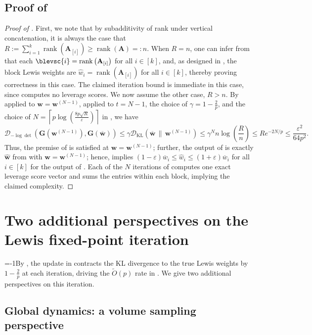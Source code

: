 \documentclass[11pt]{article}
\theoremstyle{plain}
\numberwithin{equation}{section}
\newcommand{\rank}{\operatorname{rank}}
\newcommand{\eps}{\varepsilon}
\newcommand{\bA}{\mathbf{A}}
\newcommand{\bG}{\mathbf{G}}
\newcommand{\bw}{\mathbf{w}}
\newcommand{\bwhat}{\widehat{\mathbf{w}}}
\newcommand{\bwbar}{\overline{\mathbf{w}}}
\newcommand{\bAblk}[1]{\mathbf{A}_{[#1]}}
\newcommand{\what}{\widehat{w}}
\newcommand{\wbar}{\overline{w}}
\newcommand{\omrp}{\gamma}
\newcommand{\kldiv}[2]{\mathcal{D}_{\mathrm{KL}}\left(#1 \,\|\, #2\right)}
\newcommand{\logdetdiv}[2]{\mathcal{D}_{-\log\det}\left(#1, #2\right)}
\begin{document}
\subsection{Proof of }\label{sec:main-proof}
\begin{proof}[Proof of ]
First, we note that by subadditivity of rank under vertical concatenation, it is always  the case that $R:= \sum_{i=1}^k \rank\left(\bAblk{i}\right)\geq \rank(\bA)=: n$. 
When $R = n$, one can infer from  that each $\blevsc{i}=\rank\left(\bAblk{i}\right)$ for all $i\in[k]$, and, as designed in , the block Lewis weights are  $\what_i=\rank\left(\bAblk{i}\right)$ for all $i\in[k]$, thereby proving correctness in this case. The claimed iteration bound is immediate in this case, since  computes no leverage scores.  
We now assume the other case, $R>n$.
By  applied to $\bw= \bw^{(N-1)}$,  applied to $t=N-1$, the choice of $\omrp=1-\frac{2}{p}$, and the choice of $N = \left\lceil p\log\left(\frac{8p\sqrt{R}}{\eps}\right)\right\rceil$ in , we have 
\[ \logdetdiv{\bG(\bw^{(N-1)})}{\bG(\bwbar)}\leq \omrp \kldiv{\bwbar}{\bw^{(N-1)}}\leq \gamma^N n \log\left(\frac{R}{n}\right)\leq R e^{-2N/p}\leq \frac{\eps^2}{64p^2}.\] Thus, the premise of  is satisfied at $\bw=\bw^{(N-1)}$; further, the output of  is exactly $\bwhat$ from  with $\bw=\bw^{(N-1)}$; hence,  implies $(1-\eps)\wbar_i \leq \what_i\leq (1+\eps)\wbar_i$ for all $i\in [k]$ for the output of . Each of the $N$ iterations of  computes  one exact  leverage score vector and  sums the entries within each block, implying the claimed  complexity. 
\end{proof}

\section{Two additional perspectives on the Lewis fixed-point iteration}\label{sec:intuition}
\looseness=-1By , the update in  contracts the KL divergence to the true Lewis weights by $1-\frac{2}{p}$ at each iteration, driving the $\widetilde{O}(p)$ rate in . We give two additional perspectives on this iteration.

\subsection{Global dynamics: a volume sampling perspective}\label{sec:global-intuition}
\end{document}
